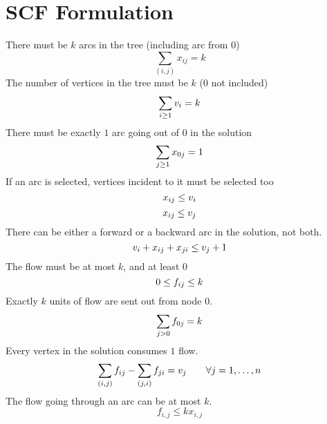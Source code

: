 \documentclass[a4paper]{article}
\numberwithin{equation}{section}
\begin{document}
\section{SCF Formulation}
There must be $k$ arcs in the tree (including arc from $0$)
\begin{equation}
	\sum_{(i,j)} x_{ij} = k
\end{equation}
The number of vertices in the tree must be $k$ ($0$ not included)
\begin{equation}
	\sum_{i \geq 1}v_i =k \\
\end{equation}
There must be exactly $1$ arc going out of $0$ in the solution
\begin{equation}
	\sum_{j \geq 1} x_{0j}=1\\
\end{equation}
If an arc is selected, vertices incident to it must be selected too
\begin{equation}
	x_{ij} \leq v_i\\
\end{equation}
\begin{equation}
	x_{ij} \leq v_j\\
\end{equation}
There can be either a forward or a backward arc in the solution, not both.
\begin{equation}
	v_i + x_{ij} + x_{ji} \leq v_j + 1\\
\end{equation}
The flow must be at most $k$, and at least $0$
\begin{equation}
	0 \leq f_{ij} \leq k\\
\end{equation}
Exactly $k$ units of flow are sent out from node $0$.
\begin{equation}
	\sum_{j>0} f_{0j}=k \\
\end{equation}
Every vertex in the solution consumes $1$ flow.
\begin{equation}
  \sum_{(i,j)} f_{ij} - \sum_{(j,i)} f_{ji} = v_j \qquad \forall j=1,\dots,n\\
\end{equation}
The flow going through an arc can be at most $k$.
\begin{equation}
	f_{i,j}\leq kx_{i,j}
\end{equation}
\end{document}
